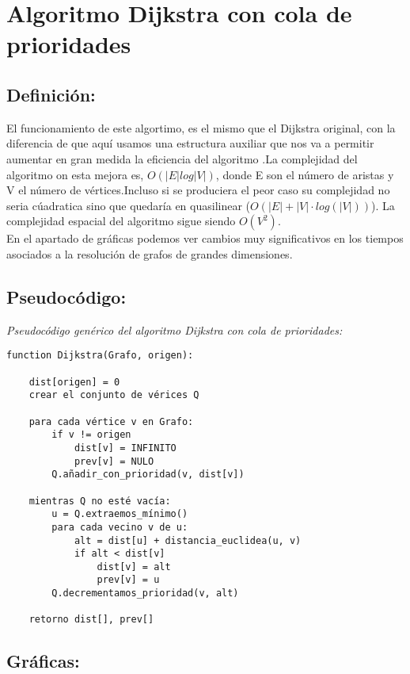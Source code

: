 \documentclass[a4paper]{llncs}
\begin{document}
\medskip
\section{Algoritmo Dijkstra con cola de prioridades}

\subsection{Definición:}
El funcionamiento de este algortimo, es el mismo que el Dijkstra original, con la diferencia de que aquí usamos una estructura auxiliar que nos va a permitir aumentar en gran medida la eficiencia del algoritmo .La complejidad del algoritmo on esta mejora es, $O(|E| log |V|)$, donde E son el número de  aristas y V el número de vértices.Incluso si se produciera el peor caso su complejidad no seria cúadratica sino que quedaría en quasilinear ($O (|E|+|V| \cdot log(|V|))$). La complejidad espacial del algoritmo sigue siendo $O(V^2)$.\\
En el apartado de gráficas podemos ver cambios muy significativos en los tiempos asociados a la resolución de grafos de grandes dimensiones.

\subsection{Pseudocódigo: }

{\it Pseudocódigo genérico del algoritmo Dijkstra con cola de prioridades: }
\begin{verbatim}
function Dijkstra(Grafo, origen):
    
    dist[origen] = 0                                  
    crear el conjunto de vérices Q

    para cada vértice v en Grafo:           
        if v != origen
            dist[v] = INFINITO  
            prev[v] = NULO 
        Q.añadir_con_prioridad(v, dist[v])
        
    mientras Q no esté vacía:                             
        u = Q.extraemos_mínimo()                           
        para cada vecino v de u:                     
            alt = dist[u] + distancia_euclidea(u, v) 
            if alt < dist[v]
                dist[v] = alt
                prev[v] = u
        Q.decrementamos_prioridad(v, alt)

    retorno dist[], prev[]
\end{verbatim}

\subsection{Gráficas:}
\end{document}
